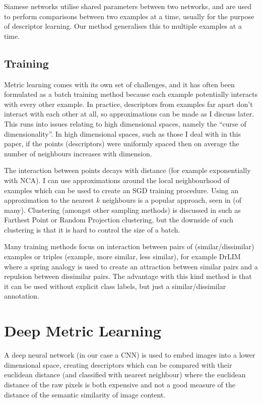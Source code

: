 Siamese networks utilise shared parameters between two networks, and are used to perform comparisons between two examples at a time, usually for the purpose of descriptor learning. Our method generalises this to multiple examples at a time.

\subsection {Training}

Metric learning comes with its own set of challenges, and it has often been formulated as a batch training method because each example potentially interacts with every other example. In practice, descriptors from examples far apart don't interact with each other at all, so approximations can be made as I discuss later. This runs into issues relating to high dimensional spaces, namely the ``curse of dimensionality''. In high dimensional spaces, such as those I deal with in this paper, if the points (descriptors) were uniformly spaced then on average the number of neighbours increases with dimension. 

The interaction between points decays with distance (for example exponentially with \gls{NCA}). I can use approximations around the local neighbourhood of examples which can be used to create an \gls{SGD} training procedure. Using an approximation to the nearest $ k $ neighbours is a popular approach, seen in \cite{Mensink2012,Zaidi2011} (of many). Clustering (amongst other sampling methods) is discussed in  \cite{Oneat2011} such as Farthest Point or Random Projection clustering, but the downside of such clustering is that it is hard to control the size of a batch. 

Many training methods focus on interaction between pairs of (similar/dissimilar) examples or triples (example, more similar, less similar), for example DrLIM \cite{Hadsell2006} where a spring analogy is used to create an attraction between similar pairs and a repulsion between dissimilar pairs. The advantage with this kind method is that it can be used without explicit class labels, but just a similar/dissimilar annotation.

\section {Deep Metric Learning}

A deep neural network (in our case a \gls{CNN}) is used to embed images into a lower dimensional space, creating descriptors which can be compared with their euclidean distance (and classified with nearest neighbour) where the euclidean distance of the raw pixels is both expensive and not a good measure of the distance of the semantic similarity of image content. 

